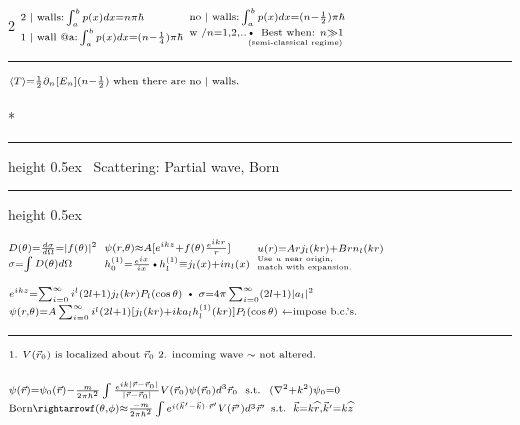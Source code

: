 \documentclass{article}
\makeatletter
\def\HrulefillThin{\leavevmode\leaders\hrule height 0.5ex \hfill\kern\z@}
\newcommand{\YgorUD}[2]{\,\!^{#1}_{#2}}
\renewcommand{\subsection}[1]{%
     \@startsection{subsection}{2}{0mm}{0.01ex}{0.01ex}{%
         \normalfont\Large\bfseries }*{%
         \noindent\HrulefillThin%
              ~#1~\HrulefillThin}}
\makeatother
\begin{document}
\begin{multicols}{2}
    $\YgorUD{%
        \text{2 | walls:}%
          \int_{ a}^{ b} p( x )dx = n\pi\hbar%
    }{%
        \text{1 | wall @a:}%
          \int_{ a}^{ b} p( x )dx = ( n - \frac{1}{4} )\pi\hbar%
    }      $\hfill\textbullet\hfill%
    $\YgorUD{%
        \text{no | walls:}%
          \int_{ a}^{ b} p( x )dx = ( n - \frac{1}{2} )\pi\hbar%
    }{%
        \text{w /} n=1,2,..%
        \smash{\underset{\text{(semi-classical regime)}}{\text{\textbullet\, Best when: }n \gg 1}}%
    }$

\hrule

    $\YgorUD{%
        \langle T\rangle = \frac{1}{2} \partial_{ n}  [ E_{n} ]%
        ( n - \frac{1}{2} )%
        \text{ when there are no | walls.}
    }{%
        \,%
    }$



\subsection{Scattering: Partial wave, Born}

$\YgorUD{%
        D ( \theta ) = \frac{d\sigma}{d\Omega} = | f ( \theta ) |^{ 2}%
    }{
        \sigma=\int    D( \theta ) d\Omega%
    } $\hfill\textbullet\hfill%
    $\YgorUD{%
        \psi( r , \theta )\approx A[e^{ ikz}%
         + f ( \theta ) \frac{e^{ ikr}}{r} ]%
    }{%
        h_{ 0}^{ ( 1 )}  = \frac{e^{ ix}}{ix}%
        \text{\textbullet}%
        h_{ l}^{ ( 1 )}  \equiv j_{ l} ( x ) + i n_{ l} ( x )%
    } $\hfill\textbullet\hfill%
    $\YgorUD{%
        u ( r )=Arj_{ l} ( kr ) + Brn_{ l} ( kr )%
    }{%
        \YgorUD{\text{Use $u$ near origin,}}{\text{match with expansion.}}%
    }$

$\YgorUD{%
        e^{ ikz}=\sum_{i=0}^{\infty} i^{l}( 2l + 1 ) %
        j_{ l} ( kr ) P_{l} ( \cos \theta )%
        \,\,\text{\textbullet}\,\, \sigma = 4\pi \sum_{i=0}^{\infty}%
         ( 2l + 1 ) | a_{ l} |^{2}%
    }{%
        \psi( r , \theta )=A\sum_{i=0}^{\infty} i^{l} ( 2l + 1 ) %
        [j_{ l} ( kr ) + ika_{ l}h_{ l}^{ ( 1 )}  ( kr ) ]P_{l} ( \cos \theta )%
        \,\,\leftarrow \text{impose b.c.'s.}%
    }$

\hrule

$\YgorUD{%
        \text{1. $V ( \vec{r}_{ 0} )$ is localized about $\vec{r}_{ 0}$ %
        2. incoming wave $\sim$ not altered.}%
    }{%
    }$

$\YgorUD{%
        \psi ( \vec{r}) = \psi_{ 0} ( \vec{r}) - \frac{m}{2 \pi \hbar^{2}}%
          \int  \frac{e^{ ik| \vec{r} - \vec{r}_{ 0} |}}{%
        | \vec{r} - \vec{r}_{ 0} |} V ( \vec{r}_{ 0} )%
        \psi ( \vec{r}_{ 0} ) d^{ 3} \vec{r}_{ 0}%
        \,\,\text{ s.t. }\,\,%
        ( \nabla^{2}  + k^{2} )\psi_{ 0} = 0%
    }{%
        \text{Born}\rightarrow%
        f ( \theta ,\phi ) \approx \frac{-m}{2 \pi \hbar^{2}}%
          \int   e^{ i( \vec{k}' - \vec{k} )\cdot \vec{r}'}%
        V ( \vec{r}' ) d^{ 3} \vec{r}'%
        \,\text{ s.t. }\, \vec{k}=k\widehat{r}, \vec{k}'=k\widehat{z}%
    }$


\end{multicols}
\end{document}
